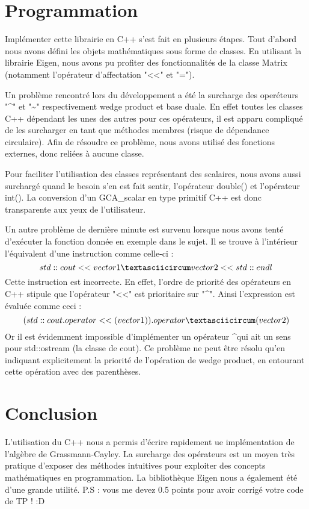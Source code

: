 \documentclass[12pt]{article}
\begin{document}
\section{Programmation}
Implémenter cette librairie en C++ s'est fait en plusieurs étapes. Tout d'abord nous avons défini les objets mathématiques sous forme de classes.
En utilisant la librairie Eigen, nous avons pu profiter des fonctionnalités de la classe Matrix (notamment l'opérateur d'affectation "<<" et "=").

Un problème rencontré lors du développement a été la surcharge des operéteurs "\textasciicircum" et "\textasciitilde" respectivement wedge product et base duale.
En effet toutes les classes C++ dépendant les unes des autres pour ces opérateurs, il est apparu compliqué de les surcharger en tant que méthodes membres (risque de dépendance circulaire).
Afin de résoudre ce problème, nous avons utilisé des fonctions externes, donc reliées à aucune classe.

Pour faciliter l'utilisation des classes représentant des scalaires, nous avons aussi surchargé quand le besoin s'en est fait sentir, l'opérateur double() et l'opérateur int(). La conversion d'un GCA\_scalar en type primitif C++ est donc transparente aux yeux de l'utilisateur. 

Un autre problème de dernière minute est survenu lorsque nous avons tenté d'exécuter la fonction donnée en exemple dans le sujet.
Il se trouve à l'intérieur l'équivalent d'une instruction comme celle-ci :
$$ std::cout << vector1 \textasciicircum vector2 << std::endl$$
Cette instruction est incorrecte. En effet, l'ordre de priorité des opérateurs en C++ stipule que l'opérateur "<<" est prioritaire sur "\textasciicircum ". Ainsi l'expression est évaluée comme ceci :
$$ (std::cout.operator<<(vector1)).operator\textasciicircum(vector2)$$
Or il est évidemment impossible d'implémenter un opérateur \textasciicircum qui ait un sens pour std::ostream (la classe de cout).
Ce problème ne peut être résolu qu'en indiquant explicitement la priorité de l'opération de wedge product, en entourant cette opération avec des parenthèses.



\newpage
\section{Conclusion}
L'utilisation du C++ nous a permis d'écrire rapidement ue implémentation de l'algèbre de Grassmann-Cayley. La surcharge des opérateurs est un moyen très pratique d'exposer des méthodes intuitives pour exploiter des concepts mathématiques en programmation.
La bibliothèque Eigen nous a également été d'une grande utilité.
\newline P.S : vous me devez 0.5 points pour avoir corrigé votre code de TP ! :D

\end{document}
